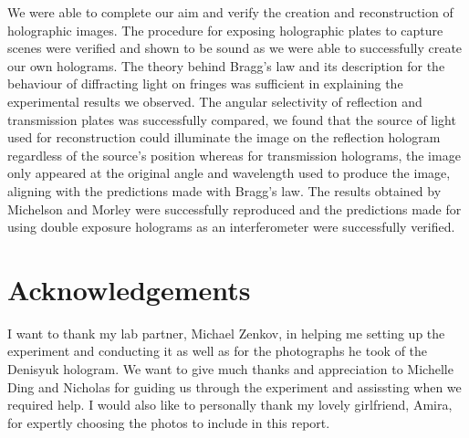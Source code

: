\documentclass[aps,prl,reprint,10pt,amsmath,amssymb,superscriptaddress,a4paper]{revtex4-2}
\begin{document}
We were able to complete our aim and verify the creation and reconstruction of holographic images. The procedure for exposing holographic plates to capture scenes were verified and shown to be sound as we were able to successfully create our 
own holograms. The theory behind Bragg's law and its description for the behaviour of diffracting light on fringes was sufficient in explaining the experimental results we observed. The angular selectivity of reflection and transmission plates 
was successfully compared, we found that the source of light used for reconstruction could illuminate the image on the reflection hologram regardless of the source's position whereas for transmission holograms, the image only appeared at the original 
angle and wavelength used to produce the image, aligning with the predictions made with Bragg's law. The results obtained by Michelson and Morley were successfully reproduced and the predictions made for using double exposure holograms as an interferometer 
were successfully verified.

\section{Acknowledgements}

I want to thank my lab partner, Michael Zenkov, in helping me setting up the experiment and conducting it as well as for the photographs he took of the Denisyuk hologram. We want to give much thanks and appreciation to Michelle Ding and Nicholas for guiding us 
through the experiment and assissting when we required help. I would also like to personally thank my lovely girlfriend, Amira, for expertly choosing the photos to include in this report.



\end{document}
